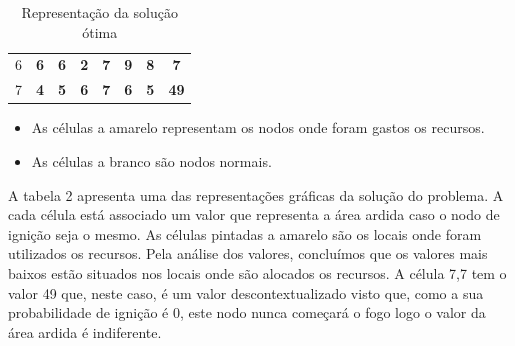 \documentclass[11pt]{article} %
\begin{document}
\begin{table}[h]
\begin{tabular}{cccccccc}
\multicolumn{1}{c|}{6} & \multicolumn{1}{c|}{\cellcolor[HTML]{FFFFFF}\textbf{6}} & \multicolumn{1}{c|}{\cellcolor[HTML]{FFFFFF}\textbf{6}} & \multicolumn{1}{c|}{\cellcolor[HTML]{F8FF00}\textbf{2}} & \multicolumn{1}{c|}{\cellcolor[HTML]{FFFFFF}\textbf{7}} & \multicolumn{1}{c|}{\cellcolor[HTML]{FFFFFF}\textbf{9}} & \multicolumn{1}{c|}{\cellcolor[HTML]{FFFFFF}\textbf{8}} & \multicolumn{1}{c|}{\cellcolor[HTML]{FFFFFF}\textbf{7}}  \\ \cline{2-8} 
\multicolumn{1}{c|}{7} & \multicolumn{1}{c|}{\cellcolor[HTML]{FFFFFF}\textbf{4}} & \multicolumn{1}{c|}{\cellcolor[HTML]{FFFFFF}\textbf{5}} & \multicolumn{1}{c|}{\cellcolor[HTML]{FFFFFF}\textbf{6}} & \multicolumn{1}{c|}{\cellcolor[HTML]{FFFFFF}\textbf{7}} & \multicolumn{1}{c|}{\cellcolor[HTML]{FFFFFF}\textbf{6}} & \multicolumn{1}{c|}{\cellcolor[HTML]{FFFFFF}\textbf{5}} & \multicolumn{1}{c|}{\cellcolor[HTML]{FFFFFF}\textbf{49}} \\ \cline{2-8} 
\end{tabular}
\caption{Representação da solução ótima}
\end{table}

\begin{itemize}[$\ast$]
	\item As células a amarelo representam os nodos onde foram gastos os recursos.
    \item As células a branco são nodos normais.
\end{itemize}
A tabela 2 apresenta uma das representações gráficas da solução do problema. A cada célula está associado um valor que representa a área ardida caso o nodo de ignição seja o mesmo. As células pintadas a amarelo são os locais onde foram utilizados os recursos. Pela análise dos valores, concluímos que os valores mais baixos estão situados nos locais onde são alocados os recursos. A célula 7,7 tem o valor 49 que, neste caso, é um valor descontextualizado visto que, como a sua probabilidade de ignição é 0, este nodo nunca começará o fogo logo o valor da área ardida é indiferente.
\end{document}
